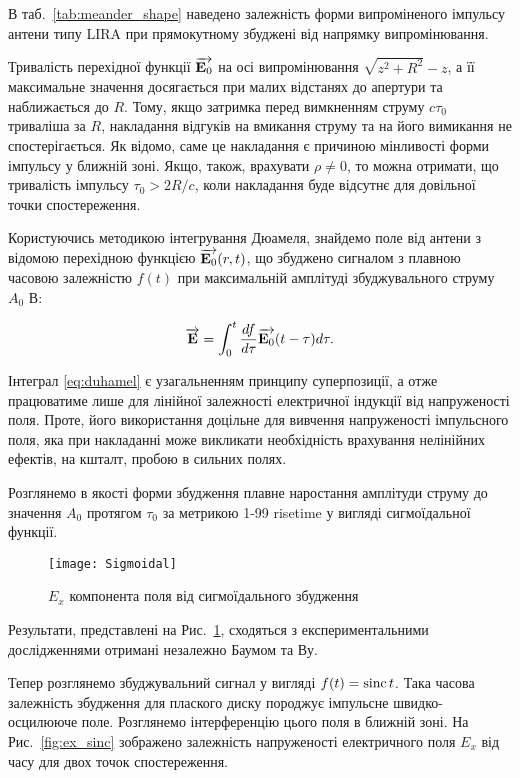 В таб.~\ref{tab:meander_shape} наведено залежність форми випроміненого 
імпульсу антени типу LIRA при прямокутному збуджені від напрямку 
випромінювання.

Тривалість перехідної функції $ \overrightarrow{\mathbf E_0} $ на осі випромінювання 
$ \sqrt{z^2+R^2} - z $, а її максимальне значення досягається при малих 
відстанях до апертури та наближається до $ R $. Тому, якщо затримка перед 
вимкненням струму $ c \tau_0 $ триваліша за $ R $, накладання відгуків 
на вмикання струму та на його вимикання не спостерігається. Як відомо, саме 
це накладання є причиною мінливості форми імпульсу у ближній зоні. Якщо, 
також, врахувати $ \rho \neq 0 $, то можна отримати, що тривалість імпульсу 
$ \tau_0 > 2R/c $, коли накладання буде відсутнє для довільної 
точки спостереження.

Користуючись методикою інтегрування Дюамеля, \cite[ст. 40]{imp:Kharkevich1950} 
знайдемо поле від антени з відомою перехідною функцією $ \overrightarrow{\mathbf E_0} (r,t) $, 
що збуджено сигналом з плавною часовою залежністю $ f(t) $ при 
максимальній амплітуді збуджувального струму $ A_0 $ В:

\begin{equation} \label{eq:duhamel}
\overrightarrow{\mathbf E} = \int_0^t \frac{d f}{d \tau} \overrightarrow{\mathbf E_0} (t - \tau) d \tau.
\end{equation}

Інтеграл \eqref{eq:duhamel} є узагальненням принципу суперпозиції, а отже
працюватиме лише для лінійної залежності електричної індукції від 
напруженості поля. Проте, його використання доцільне для вивчення 
напруженості імпульсного поля, яка при накладанні може викликати 
необхідність врахування нелінійних ефектів, на кшталт, пробою в сильних полях.

Розглянемо в якості форми збудження плавне наростання амплітуди струму до 
значення $ A_0 $ протягом $ \tau_0 $ за метрикою 1-99 risetime у вигляді 
сигмоїдальної функції.

\begin{figure}[h] \begin{center}
\texttt{[image: Sigmoidal]}
\caption{$ E_x $ компонента поля від сигмоїдального збудження}
\label{fig:ex_sigmoidal}
\end{center} \end{figure}

Результати, представлені на Рис.~\ref{fig:ex_sigmoidal}, сходяться з 
експериментальними дослідженнями отримані незалежно Баумом та Ву.

Тепер розглянемо збуджувальний сигнал у вигляді $ f(t) = \operatorname{sinc} t $.
Така часова залежність збудження для плаского диску породжує імпульсне
швидко-осцилююче поле. Розглянемо інтерференцію цього поля в ближній зоні.
На Рис.~\ref{fig:ex_sinc} зображено залежність напруженості електричного 
поля $ E_x $ від часу для двох точок спостереження.


